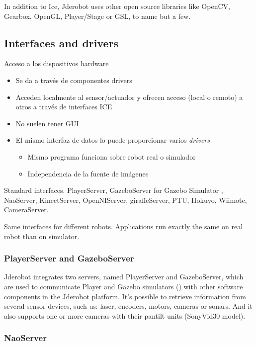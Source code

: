 \documentclass[twocolumn]{svjour3}          %
\begin{document}
In addition to Ice, Jderobot uses other open source libraries like OpenCV, Gearbox, OpenGL, Player/Stage or GSL, to name but a few.

\subsection{Interfaces and drivers}


Acceso a los dispositivos hardware
\begin{itemize}
\item Se da a través de {componentes drivers}
\item Acceden localmente al sensor/actuador y ofrecen acceso (local o remoto) a otros a través de interfaces ICE
\item No suelen tener GUI
\item El mismo interfaz de datos lo puede proporcionar varios \textit{drivers}
\begin{itemize}
\item Mismo programa funciona sobre robot real o simulador
\item Independencia de la fuente de imágenes
\end{itemize}
\end{itemize}


Standard interfaces. 
PlayerServer, GazeboServer for Gazebo Simulator , NaoServer, KinectServer, OpenNIServer, giraffeServer, PTU, Hokuyo, Wiimote, CameraServer.

Same interfaces for different robots.
Applications run exactly the same on real robot than on simulator. 

\subsubsection{PlayerServer and GazeboServer}
\label{subsec:gazeboserver}

Jderobot integrates two servers, named PlayerServer and GazeboServer, which are used to communicate Player and Gazebo simulators (\cite{koening2004}) with other software components in the Jderobot platform. It's possible to retrieve information from several sensor devices, such us: laser, encoders, motors, cameras or sonars. And it also supports one or more cameras with their pantilt units (SonyVid30 model).

\subsubsection{NaoServer}
\end{document}
